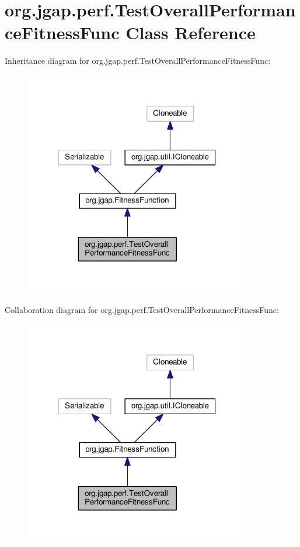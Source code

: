 \hypertarget{classorg_1_1jgap_1_1perf_1_1_test_overall_performance_fitness_func}{\section{org.\-jgap.\-perf.\-Test\-Overall\-Performance\-Fitness\-Func Class Reference}
\label{classorg_1_1jgap_1_1perf_1_1_test_overall_performance_fitness_func}
}


Inheritance diagram for org.\-jgap.\-perf.\-Test\-Overall\-Performance\-Fitness\-Func\-:
\nopagebreak
\begin{figure}[H]
\begin{center}
\leavevmode
\includegraphics[width=280pt]{classorg_1_1jgap_1_1perf_1_1_test_overall_performance_fitness_func__inherit__graph}
\end{center}
\end{figure}


Collaboration diagram for org.\-jgap.\-perf.\-Test\-Overall\-Performance\-Fitness\-Func\-:
\nopagebreak
\begin{figure}[H]
\begin{center}
\leavevmode
\includegraphics[width=280pt]{classorg_1_1jgap_1_1perf_1_1_test_overall_performance_fitness_func__coll__graph}
\end{center}
\end{figure}
